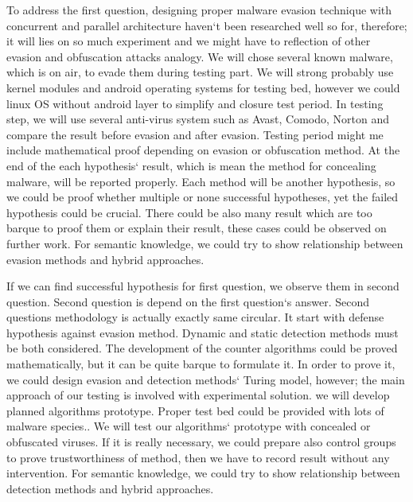 \documentclass[informationsecurity]{gucmasterproject}
\begin{document}


To address the first question, designing proper malware evasion technique with concurrent and parallel architecture haven`t been researched well so for, therefore; it will lies on so much experiment and we might have to reflection of other evasion and obfuscation attacks analogy.  We will chose several known malware, which is on air, to  evade them during testing part. We will strong probably use kernel modules and android operating systems for testing bed, however we could linux OS without android layer to simplify and closure test period. In testing step, we will use several anti-virus system such as Avast, Comodo, Norton and compare the result before evasion and after evasion. Testing period might me include mathematical proof depending on evasion or obfuscation method. At the end of the each hypothesis` result, which is mean the method for concealing malware, will be reported properly. Each method will be another hypothesis, so we could be proof whether multiple or none successful hypotheses, yet the failed hypothesis could be crucial. There could be also many result which are too barque to proof them or explain their result, these cases could be observed on further work. For semantic knowledge, we could try to show relationship between evasion methods and hybrid approaches.

If we can find successful hypothesis for first question, we observe them in second question. Second question is depend on the first question`s answer. Second questions methodology is actually exactly same circular. It start with defense hypothesis against evasion method. Dynamic and static detection methods must be both considered. The development of the counter algorithms could be proved mathematically, but it can be quite barque to formulate it. In order to prove it, we could design evasion and detection methods` Turing model, however; the main approach of our testing is involved with experimental solution. we will develop planned algorithms prototype. Proper test bed could be provided with lots of malware species.. We will test our algorithms` prototype with concealed or obfuscated viruses. If it is really necessary, we could prepare also control groups to prove trustworthiness of method, then we have to record result without any intervention. For semantic knowledge, we could try to show relationship between detection methods and hybrid approaches.
\newpage
\end{document}
